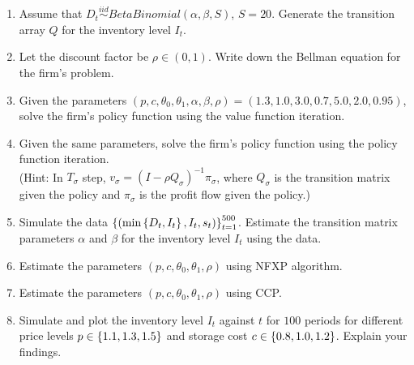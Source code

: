 \documentclass[12pt]{article}
\begin{document}
\begin{enumerate}
    \item Assume that $D_t\overset{iid}{\sim}BetaBinomial(\alpha, \beta, S)$, $S=20$.
    Generate the transition array $Q$ for the inventory level $I_t$.
    \item Let the discount factor be $\rho\in (0,1)$. Write down the Bellman equation 
    for the firm's problem. 
    \item Given the parameters $(p,c,\theta_0,\theta_1,\alpha,\beta,\rho) = (1.3, 1.0, 3.0, 0.7,5.0,2.0,0.95)$,
    solve the firm's policy function using the value function 
    iteration. 
    \item Given the same parameters, solve the firm's policy function using the policy function 
    iteration. \\
    (Hint: In $T_\sigma$ step, $v_\sigma = (I-\rho Q_\sigma)^{-1}\pi_\sigma$, where $Q_\sigma$ is the transition matrix 
    given the policy and $\pi_\sigma$ is the profit flow given the policy.)
    \item Simulate the data $\left\{ {(\min\left\{ {D_t, I_t} \right\}, I_t, s_t)} \right\}_{t=1}^{500}$. Estimate the 
    transition matrix parameters $\alpha$ and $\beta$ for the inventory level $I_t$ 
    using the data. 
    \item Estimate the parameters $(p,c,\theta_0,\theta_1,\rho)$ using NFXP algorithm. 
    \item Estimate the parameters $(p,c,\theta_0,\theta_1,\rho)$ using CCP.
    \item Simulate and plot the inventory level $I_t$ against $t$ for $100$ periods for 
    different price levels $p\in\left\{ {1.1, 1.3, 1.5} \right\}$ and storage cost $c\in\left\{ {0.8, 1.0, 1.2} \right\}$. 
    Explain your findings.
\end{enumerate}
\end{document}

